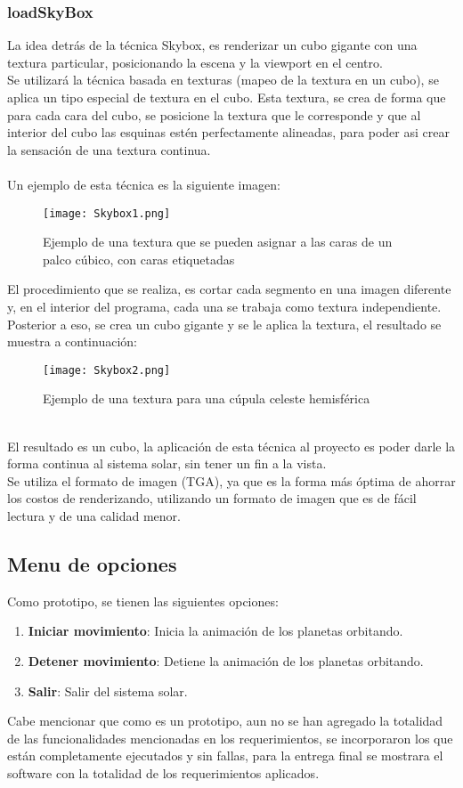 \documentclass[12pt,journal,compsoc]{IEEEtran}
\begin{document}
\subsubsection{loadSkyBox}
La idea detrás de la técnica Skybox, es renderizar un cubo gigante con una textura particular, posicionando la escena y la viewport en el centro\cite{skybox}.\\
Se utilizará la técnica basada en texturas (mapeo de la textura en un cubo), se aplica un tipo especial de textura en el cubo. Esta textura, se crea de forma que para cada cara del cubo, se posicione la textura que le corresponde y que al interior del cubo las esquinas estén perfectamente alineadas, para poder asi crear la sensación de una textura continua.\\
\\
Un ejemplo de esta técnica es la siguiente imagen:
%

\begin{figure}[h!]
	\texttt{[image: Skybox1.png]}
	\centering
	\caption{Ejemplo de una textura que se pueden asignar a las caras de un palco cúbico, con caras etiquetadas}
\end{figure}
%
El procedimiento que se realiza, es cortar cada segmento en una imagen diferente y, en el interior del programa, cada una se trabaja como textura independiente. Posterior a eso, se crea un cubo gigante y se le aplica la textura, el resultado se muestra a continuación:\\
%
\begin{figure}[h!]
	\texttt{[image: Skybox2.png]}
	\centering
	\caption{Ejemplo de una textura para una cúpula celeste hemisférica}
\end{figure}
%
\\
El resultado es un cubo, la aplicación de esta técnica al proyecto es poder darle la forma continua al sistema solar, sin tener un fin a la vista.\\
Se utiliza el formato de imagen (TGA), ya que es la forma más óptima de ahorrar los costos de renderizando\cite{foley}, utilizando un formato de imagen que es de fácil lectura y de una calidad menor.
%
\subsection{Menu de opciones}

Como prototipo, se tienen las siguientes opciones:

\begin{enumerate}
	\item \textbf{Iniciar movimiento}: Inicia la animación de los planetas orbitando.
	\item \textbf{Detener movimiento}: Detiene la animación de los planetas orbitando.
	\item \textbf{Salir}: Salir del sistema solar.
\end{enumerate}
Cabe mencionar que como es un prototipo, aun no se han agregado la totalidad de las funcionalidades mencionadas en los requerimientos, se incorporaron los que están completamente ejecutados y sin fallas, para la entrega final se mostrara el software con la totalidad de los requerimientos aplicados.
\end{document}
